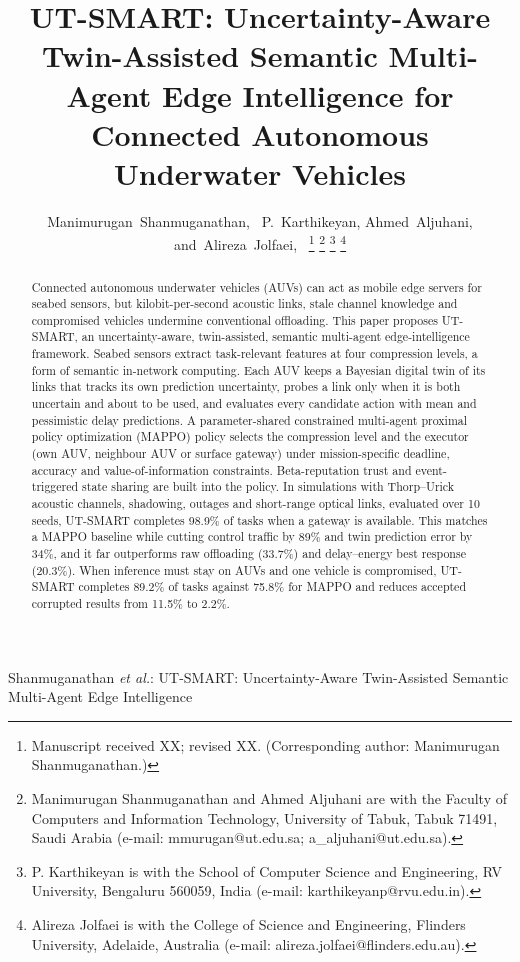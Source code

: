 \documentclass[lettersize,journal]{IEEEtran}
\begin{document}
\title{UT-SMART: Uncertainty-Aware Twin-Assisted Semantic Multi-Agent Edge Intelligence for Connected Autonomous Underwater Vehicles}

\author{Manimurugan~Shanmuganathan,~
        P.~Karthikeyan,
        Ahmed~Aljuhani,
        and~Alireza~Jolfaei,~%
\thanks{Manuscript received XX; revised XX. (Corresponding author: Manimurugan Shanmuganathan.)}%
\thanks{Manimurugan Shanmuganathan and Ahmed Aljuhani are with the Faculty of Computers and Information Technology, University of Tabuk, Tabuk 71491, Saudi Arabia (e-mail: mmurugan@ut.edu.sa; a\_aljuhani@ut.edu.sa).}%
\thanks{P. Karthikeyan is with the School of Computer Science and Engineering, RV University, Bengaluru 560059, India (e-mail: karthikeyanp@rvu.edu.in).}%
\thanks{Alireza Jolfaei is with the College of Science and Engineering, Flinders University, Adelaide, Australia (e-mail: alireza.jolfaei@flinders.edu.au).}}

%
{Shanmuganathan \MakeLowercase{\textit{et al.}}: UT-SMART: Uncertainty-Aware Twin-Assisted Semantic Multi-Agent Edge Intelligence}

\maketitle

\begin{abstract}
Connected autonomous underwater vehicles (AUVs) can act as mobile edge servers for seabed sensors, but kilobit-per-second acoustic links, stale channel knowledge and compromised vehicles undermine conventional offloading. This paper proposes UT-SMART, an uncertainty-aware, twin-assisted, semantic multi-agent edge-intelligence framework. Seabed sensors extract task-relevant features at four compression levels, a form of semantic in-network computing. Each AUV keeps a Bayesian digital twin of its links that tracks its own prediction uncertainty, probes a link only when it is both uncertain and about to be used, and evaluates every candidate action with mean and pessimistic delay predictions. A parameter-shared constrained multi-agent proximal policy optimization (MAPPO) policy selects the compression level and the executor (own AUV, neighbour AUV or surface gateway) under mission-specific deadline, accuracy and value-of-information constraints. Beta-reputation trust and event-triggered state sharing are built into the policy. In simulations with Thorp--Urick acoustic channels, shadowing, outages and short-range optical links, evaluated over 10 seeds, UT-SMART completes 98.9\% of tasks when a gateway is available. This matches a MAPPO baseline while cutting control traffic by 89\% and twin prediction error by 34\%, and it far outperforms raw offloading (33.7\%) and delay--energy best response (20.3\%). When inference must stay on AUVs and one vehicle is compromised, UT-SMART completes 89.2\% of tasks against 75.8\% for MAPPO and reduces accepted corrupted results from 11.5\% to 2.2\%.
\end{abstract}
\end{document}

